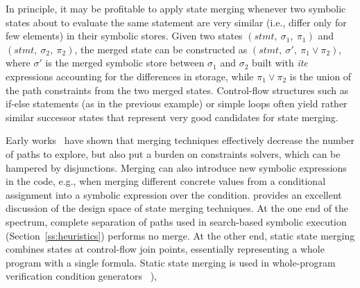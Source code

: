  In principle, it may be profitable to apply state merging whenever two symbolic states about to evaluate the same statement are very similar (i.e., differ only for few elements) in their symbolic stores. Given two states $(stmt,~\sigma_1,~\pi_1)$ and $(stmt,~\sigma_2,~\pi_2)$, the merged state can be constructed as $(stmt,~\sigma',~\pi_1 \vee \pi_2)$, where $\sigma'$ is the merged symbolic store between $\sigma_1$ and $\sigma_2$ built with {\em ite} expressions accounting for the differences in storage, while $\pi_1 \vee \pi_2$ is the union of the path constraints from the two merged states. Control-flow structures such as if-else statements (as in the previous example) or simple loops often yield rather similar successor states that represent very good candidates for state merging.

Early works~\cite{G-POPL07,HSS-RV09} have shown that merging techniques effectively decrease the number of paths to explore, but also put a burden on constraints solvers, which can be hampered by disjunctions. Merging can also introduce new symbolic expressions in the code, e.g., when merging different concrete values from a conditional assignment into a symbolic expression over the condition. \cite{KKB-PLDI12} provides an excellent discussion of the design space of state merging techniques. At the one end of the spectrum, complete separation of paths used in search-based symbolic execution (Section~\ref{ss:heuristics}) performs no merge. At the other end, static state merging combines states at control-flow join points, essentially representing a whole program with a single formula. Static state merging is used in whole-program verification condition generators ~\cite{SATURN-POPL05,CALYSTO-ICSE08}), 



